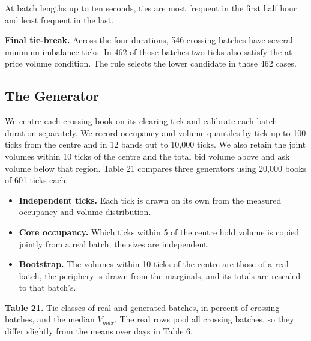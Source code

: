 At batch lengths up to ten seconds, ties are most frequent in the first half hour and least frequent in the last.

\textbf{Final tie-break.} Across the four durations, 546 crossing batches have several minimum-imbalance ticks. In 462 of those batches two ticks also satisfy the at-price volume condition. The rule selects the lower candidate in those 462 cases.

\subsection{The Generator}

We centre each crossing book on its clearing tick and calibrate each batch duration separately. We record occupancy and volume quantiles by tick up to 100 ticks from the centre and in 12 bands out to 10,000 ticks. We also retain the joint volumes within 10 ticks of the centre and the total bid volume above and ask volume below that region. Table 21 compares three generators using 20,000 books of 601 ticks each.

\begin{itemize}
\item \textbf{Independent ticks.} Each tick is drawn on its own from the measured occupancy and volume distribution.
\item \textbf{Core occupancy.} Which ticks within 5 of the centre hold volume is copied jointly from a real batch; the sizes are independent.
\item \textbf{Bootstrap.} The volumes within 10 ticks of the centre are those of a real batch, the periphery is drawn from the marginals, and its totals are rescaled to that batch's.
\end{itemize}

\textbf{Table 21.} Tie classes of real and generated batches, in percent of crossing batches, and the median \(V_{max}\). The real rows pool all crossing batches, so they differ slightly from the means over days in Table 6.

